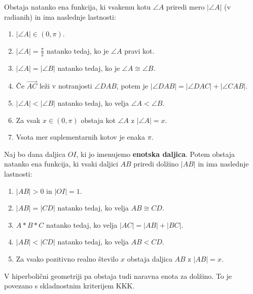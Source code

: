     \begin{izrek}
        Obstaja natanko ena funkcija, ki vsakemu kotu $\angle A$ priredi mero $|\angle A|$ (v radianih) in ima naslednje lastnosti:
        \begin{enumerate}
            \item $|\angle A| \in (0, \pi)$.
            \item $|\angle A|=\frac{\pi}{2}$ natanko tedaj, ko je $\angle A$ pravi kot.
            \item $|\angle A| = |\angle B|$ natanko tedaj, ko je $\angle A\cong \angle B$.
            \item Če $\overrightarrow{AC}$ leži v notranjosti $\angle DAB$, potem je $|\angle DAB|=|\angle DAC| + |\angle CAB|$.
            \item $|\angle A| < |\angle B|$ natanko tedaj, ko velja $\angle A < \angle B$.
            \item Za vsak $x\in(0,\pi)$ obstaja kot $\angle A$ z $|\angle A|=x$.
            \item Vsota mer suplementarnih kotov je enaka $\pi$.
        \end{enumerate}
    \end{izrek}

    \begin{izrek}
        Naj bo dana daljica $OI$, ki jo imenujemo \textbf{enotska daljica}. Potem obstaja natanko ena funkcija, ki vsaki daljici $AB$ priredi dolžino $|AB|$ in ima naslednje lastnosti:
        \begin{enumerate}
            \item $|AB|>0$ in $|OI|=1$.
            \item $|AB|=|CD|$ natanko tedaj, ko velja $AB\cong CD$.
            \item $A\ast B\ast C$ natanko tedaj, ko velja $|AC|=|AB|+|BC|$.
            \item $|AB|<|CD|$ natanko tedaj, ko velja $AB<CD$.
            \item Za vsako pozitivno realno število $x$ obstaja daljica $AB$ z $|AB|=x$.
        \end{enumerate}
    \end{izrek}

    \begin{opomba}
        V hiperbolični geometriji pa obstaja tudi naravna enota za dolžino. To je povezano s skladnostnim kriterijem KKK.
    \end{opomba}

